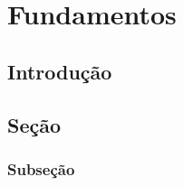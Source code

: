 \chapter{Fundamentos}

\section{Introdução}

\lipsum[1-4]

\section{Seção}

\lipsum[2-4]

\subsection{Subseção}

\lipsum[2-4]